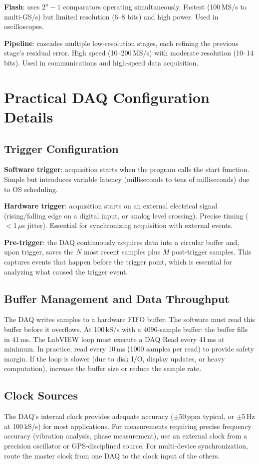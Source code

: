 \documentclass[11pt,letterpaper,twoside,openany]{book}
\begin{document}
\textbf{Flash}: uses $2^n - 1$ comparators operating simultaneously. Fastest (100\,MS/s to multi-GS/s) but limited resolution (6--8 bits) and high power. Used in oscilloscopes.

\textbf{Pipeline}: cascades multiple low-resolution stages, each refining the previous stage's residual error. High speed (10--200\,MS/s) with moderate resolution (10--14 bits). Used in communications and high-speed data acquisition.

\section{Practical DAQ Configuration Details}
\subsection{Trigger Configuration}
\textbf{Software trigger}: acquisition starts when the program calls the start function. Simple but introduces variable latency (milliseconds to tens of milliseconds) due to OS scheduling.

\textbf{Hardware trigger}: acquisition starts on an external electrical signal (rising/falling edge on a digital input, or analog level crossing). Precise timing ($<$1\,$\mu$s jitter). Essential for synchronizing acquisition with external events.

\textbf{Pre-trigger}: the DAQ continuously acquires data into a circular buffer and, upon trigger, saves the $N$ most recent samples plus $M$ post-trigger samples. This captures events that happen before the trigger point, which is essential for analyzing what caused the trigger event.

\subsection{Buffer Management and Data Throughput}
The DAQ writes samples to a hardware FIFO buffer. The software must read this buffer before it overflows. At 100\,kS/s with a 4096-sample buffer: the buffer fills in 41\,ms. The LabVIEW loop must execute a DAQ Read every 41\,ms at minimum. In practice, read every 10\,ms (1000 samples per read) to provide safety margin. If the loop is slower (due to disk I/O, display updates, or heavy computation), increase the buffer size or reduce the sample rate.

\subsection{Clock Sources}
The DAQ's internal clock provides adequate accuracy ($\pm$50\,ppm typical, or $\pm$5\,Hz at 100\,kS/s) for most applications. For measurements requiring precise frequency accuracy (vibration analysis, phase measurement), use an external clock from a precision oscillator or GPS-disciplined source. For multi-device synchronization, route the master clock from one DAQ to the clock input of the others.
\end{document}
